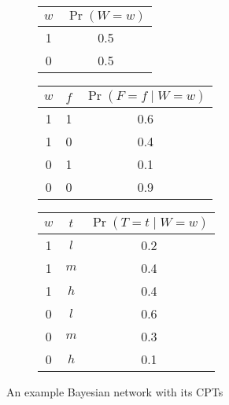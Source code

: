 \documentclass{article}
\theoremstyle{definition}
\theoremstyle{remark}
\begin{document}
\begin{figure}
  \centering
  \begin{subfigure}{0.2\textwidth}
    \centering
  \end{subfigure}%
  \begin{subfigure}{0.8\textwidth}
    \centering
    \begin{tabular}[t]{cc}
      \toprule
      $w$ & $\Pr(W = w)$ \\
      \midrule
      1 & 0.5 \\
      0 & 0.5 \\
      \bottomrule
    \end{tabular}
    \begin{tabular}[t]{ccc}
      \toprule
      $w$ & $f$ & $\Pr(F = f \mid W = w)$ \\
      \midrule
      1 & 1 & 0.6 \\
      1 & 0 & 0.4 \\
      0 & 1 & 0.1 \\
      0 & 0 & 0.9 \\
      \bottomrule
    \end{tabular}
    \begin{tabular}[t]{ccc}
      \toprule
      $w$ & $t$ & $\Pr(T = t \mid W = w)$ \\
      \midrule
      1 & $l$ & 0.2 \\
      1 & $m$ & 0.4 \\
      1 & $h$ & 0.4 \\
      0 & $l$ & 0.6 \\
      0 & $m$ & 0.3 \\
      0 & $h$ & 0.1 \\
      \bottomrule
    \end{tabular}
  \end{subfigure}
  \caption{An example Bayesian network with its CPTs}
  \label{fig:example_bn}
\end{figure}
\end{document}
